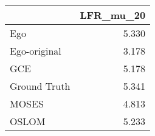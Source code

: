 \begin{tabular}{lr}
\toprule
{} & LFR_mu_20 \\
\midrule
Ego          &     5.330 \\
Ego-original &     3.178 \\
GCE          &     5.178 \\
Ground Truth &     5.341 \\
MOSES        &     4.813 \\
OSLOM        &     5.233 \\
\bottomrule
\end{tabular}
